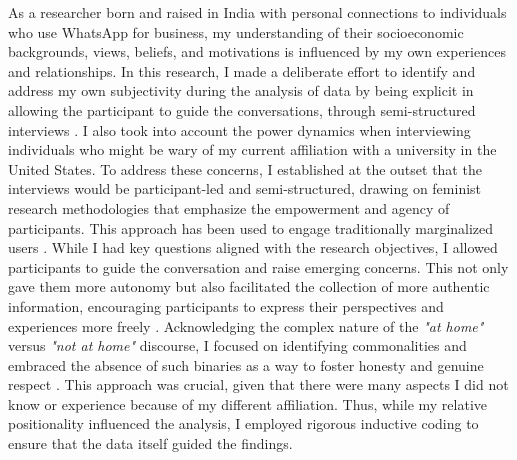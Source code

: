 As a researcher born and raised in India with personal connections to individuals who use WhatsApp for business, my understanding of their socioeconomic backgrounds, views, beliefs, and motivations is influenced by my own experiences and relationships. In this research, I made a deliberate effort to identify and address my own subjectivity during the analysis of data by being explicit in allowing the participant to guide the conversations, through semi-structured interviews \cite{berger2015now, doi:10.1177/1468794112439005}. I also took into account the power dynamics when interviewing individuals who might be wary of my current affiliation with a university in the United States. To address these concerns, I established at the outset that the interviews would be participant-led and semi-structured, drawing on feminist research methodologies that emphasize the empowerment and agency of participants. This approach has been used to engage traditionally marginalized users \cite{doi:10.1177/1468794112439005}. While I had key questions aligned with the research objectives, I allowed participants to guide the conversation and raise emerging concerns. This not only gave them more autonomy but also facilitated the collection of more authentic information, encouraging participants to express their perspectives and experiences more freely \cite{doi:10.1177/1468794112439005}. Acknowledging the complex nature of the \textit{"at home"} versus \textit{"not at home"} discourse, I focused on identifying commonalities and embraced the absence of such binaries as a way to foster honesty and genuine respect \cite{doi:10.1177/1468794114550440}. This approach was crucial, given that there were many aspects I did not know or experience because of my different affiliation. Thus, while my relative positionality influenced the analysis, I employed rigorous inductive coding to ensure that the data itself guided the findings.




































